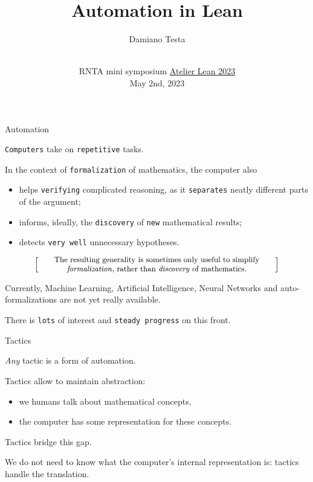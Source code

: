 \documentclass{beamer}
\title{Automation in Lean}
\author{Damiano Testa}
\institute[]{University of Warwick}
\date[\href{http://www.rnta.eu/7MSRNTA/lean.html}{Atelier Lean 2023}]{\\
\vspace{50pt}
RNTA mini symposium
\href{http://www.rnta.eu/7MSRNTA/lean.html}{Atelier Lean 2023}\\
\vspace{20pt}
May 2nd, 2023
}
\begin{document}
\frame{\titlepage}

\begin{frame}[fragile]
{Automation}

{\color{violet}\verb`Computers`} take on {\color{violet}\verb`repetitive`} tasks.

In the context of {\color{violet}\verb`formalization`} of mathematics, the computer also

\vspace{-13pt}
\begin{itemize}
\setlength\itemsep{-12pt}
\item
  helps {\color{violet}\verb`verifying`} complicated reasoning, as it {\color{violet}\verb`separates`} neatly different parts of the argument;
\item
  informs, ideally, the {\color{violet}\verb`discovery`} of {\color{violet}\verb`new`} mathematical results;
\item
  detects {\color{violet}\verb`very well`} unnecessary hypotheses.
\end{itemize}

\[
  \left[ \;
  \parbox{0.8\textwidth}{\centering\small
  The resulting generality is sometimes only useful to simplify {\emph{formalization}}, rather than {\emph{discovery}} of mathematics.
  }
  \; \right]
\]

Currently, Machine Learning, Artificial Intelligence, Neural Networks and auto-formalizations are not yet really available.

There is {\color{violet}\verb`lots`} of interest and {\color{violet}\verb`steady progress`} on this front.
\end{frame}

\begin{frame}[fragile]{Tactics}

{\emph{Any}} tactic is a form of automation.

Tactics allow to maintain abstraction:

\vspace{-13pt}
\begin{itemize}
\setlength\itemsep{-12pt}
\item
  we humans talk about mathematical concepts,
\item
  the computer has some representation for these concepts.
\end{itemize}

Tactics bridge this gap.

We do not need to know what the computer's internal representation is: tactics handle the translation.
\end{frame}
\end{document}
